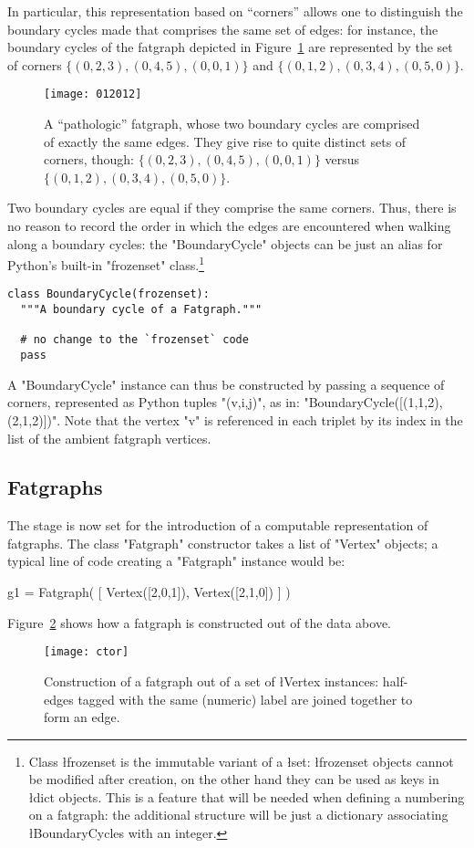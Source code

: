 In particular, this representation based on ``corners'' allows one to
distinguish the boundary cycles made that comprises the same set of
edges: for instance, the boundary cycles of the fatgraph depicted in
Figure~\ref{fig:012012} are represented by the set of corners $\{(0, 2, 3),
(0, 4, 5), (0, 0, 1)\}$ and $\{(0, 1, 2), (0, 3, 4), (0, 5, 0)\}$.
\begin{figure}
  \centering
  \texttt{[image: 012012]}
  \caption{A ``pathologic'' fatgraph, whose two boundary cycles are
    comprised of exactly the same edges. They give rise to quite
    distinct sets of corners, though: $\{(0, 2, 3), (0, 4, 5), (0, 0,
    1)\}$ versus $\{(0, 1, 2), (0, 3, 4), (0, 5, 0)\}$.}
  \label{fig:012012}
\end{figure}

Two boundary cycles are equal if they comprise the same corners.
Thus, there is no reason to record the order in which the edges are
encountered when walking along a boundary cycles: the "BoundaryCycle"
objects can be just an alias for Python's built-in "frozenset"
class.\footnote{Class \l{frozenset} is the immutable variant of a
  \l{set}: \l{frozenset} objects cannot be modified after creation, on
  the other hand they can be used as keys in \l{dict} objects.  This
  is a feature that will be needed when defining a numbering on a
  fatgraph: the additional structure will be just a dictionary
  associating \l{BoundaryCycles} with an integer.}
\begin{lstlisting}
class BoundaryCycle(frozenset):
  """A boundary cycle of a Fatgraph."""

  # no change to the `frozenset` code
  pass 

\end{lstlisting}
A "BoundaryCycle" instance can thus be constructed by passing a
sequence of corners, represented as Python tuples "(v,i,j)", as in:
"BoundaryCycle([(1,1,2), (2,1,2)])".  Note that the vertex "v" is
referenced in each triplet by its index in the list of the ambient
fatgraph vertices.


\subsection{Fatgraphs}
\label{sec:fatgraphs}

The stage is now set for the introduction of a computable
representation of fatgraphs.  The class "Fatgraph" constructor takes a
list of "Vertex" objects; a typical line of code creating a "Fatgraph"
instance would be:
\begin{codexmp}
  g1 = Fatgraph( [ Vertex([2,0,1]), 
                   Vertex([2,1,0]) ] )
\end{codexmp}
Figure~\ref{fig:ctor} shows how a fatgraph is constructed out of the
data above.
\begin{figure}
  \centering
  \texttt{[image: ctor]}
  \caption{Construction of a fatgraph out of a set of
    \l{Vertex} instances: half-edges tagged with the same
    (numeric) label are joined together to form an edge.}
  \label{fig:ctor}
\end{figure}

